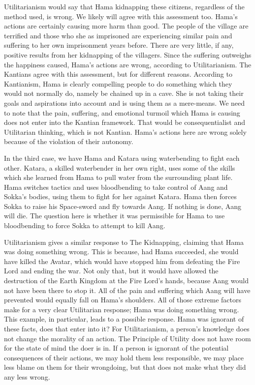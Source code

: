 Utilitarianism would say that Hama kidnapping these citizens, regardless of the method used, is wrong. We likely will agree with this assessment too. Hama’s actions are certainly causing more harm than good. The people of the village are terrified and those who she as imprisoned are experiencing similar pain and suffering to her own imprisonment years before. There are very little, if any, positive results from her kidnapping of the villagers. Since the suffering outweighs the happiness caused, Hama’s actions are wrong, according to Utilitarianism. The Kantians agree with this assessment, but for different reasons. According to Kantianism, Hama is clearly compelling people to do something which they would not normally do, namely be chained up in a cave. She is not taking their goals and aspirations into account and is using them as a mere-means. We need to note that the pain, suffering, and emotional turmoil which Hama is causing does not enter into the Kantian framework. That would be consequentialist and Utilitarian thinking, which is not Kantian. Hama’s actions here are wrong solely because of the violation of their autonomy.  

In the third case, we have Hama and Katara using waterbending to fight each other. Katara, a skilled waterbender in her own right, uses some of the skills which she learned from Hama to pull water from the surrounding plant life. Hama switches tactics and uses bloodbending to take control of Aang and Sokka’s bodies, using them to fight for her against Katara. Hama then forces Sokka to raise his Space-sword and fly towards Aang.\autocite[22:08-22:53]{puppetmaster} If nothing is done, Aang will die. The question here is whether it was permissible for Hama to use bloodbending to force Sokka to attempt to kill Aang.

Utilitarianism gives a similar response to The Kidnapping, claiming that Hama was doing something wrong. This is because, had Hama succeeded, she would have killed the Avatar, which would have stopped him from defeating the Fire Lord and ending the war. Not only that, but it would have allowed the destruction of the Earth Kingdom at the Fire Lord’s hands, because Aang would not have been there to stop it. All of the pain and suffering which Aang will have prevented would equally fall on Hama’s shoulders. All of those extreme factors make for a very clear Utilitarian response; Hama was doing something wrong. This example, in particular, leads to a possible response. Hama was ignorant of these facts, does that enter into it? For Utilitarianism, a person’s knowledge does not change the morality of an action. The Principle of Utility does not have room for the state of mind the doer is in. If a person is ignorant of the potential consequences of their actions, we may hold them less responsible, we may place less blame on them for their wrongdoing, but that does not make what they did any less wrong.

